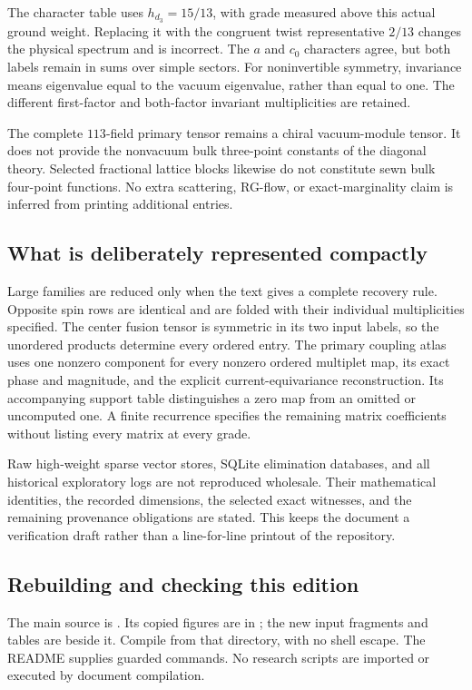 The character table uses $h_{d_3}=15/13$, with grade measured above this
actual ground weight. Replacing it with the congruent twist representative
$2/13$ changes the physical spectrum and is incorrect. The $a$ and $c_0$
characters agree, but both labels remain in sums over simple sectors.
For noninvertible symmetry, invariance means eigenvalue equal to the
vacuum eigenvalue, rather than equal to one. The different first-factor
and both-factor invariant multiplicities are retained.

The complete $113$-field primary tensor remains a chiral vacuum-module
tensor. It does not provide the nonvacuum bulk three-point constants of
the diagonal theory. Selected fractional lattice blocks likewise do not
constitute sewn bulk four-point functions. No extra scattering, RG-flow,
or exact-marginality claim is inferred from printing additional entries.

\subsection{What is deliberately represented compactly}

Large families are reduced only when the text gives a complete recovery
rule. Opposite spin rows are identical and are folded with their individual
multiplicities specified. The center fusion tensor is symmetric in its
two input labels, so the unordered products determine every ordered entry.
The primary coupling atlas uses one nonzero component for every nonzero
ordered multiplet map, its exact phase and magnitude, and the explicit
current-equivariance reconstruction. Its accompanying support table
distinguishes a zero map from an omitted or uncomputed one. A finite
recurrence specifies the remaining matrix coefficients without listing
every matrix at every grade.

Raw high-weight sparse vector stores, SQLite elimination databases, and
all historical exploratory logs are not reproduced wholesale. Their
mathematical identities, the recorded dimensions, the selected exact
witnesses, and the remaining provenance obligations are stated. This
keeps the document a verification draft rather than a line-for-line
printout of the repository.

\subsection{Rebuilding and checking this edition}

The main source is .
Its copied figures are in ; the new input fragments and
tables are beside it. Compile from that directory, with no shell escape.
The README supplies guarded commands. No research scripts are imported
or executed by document compilation.

